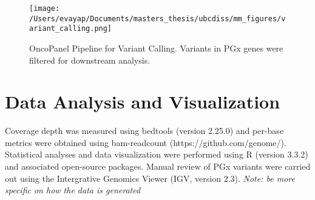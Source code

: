 \begin{figure}
    \centering
    \texttt{[image: /Users/evayap/Documents/masters\_thesis/ubcdiss/mm\_figures/variant\_calling.png]}
    \caption{OncoPanel Pipeline for Variant Calling. Variants in PGx genes were filtered for downstream analysis.}
    \label{fig:ccg-pipeline}   %
\end{figure}

\section{Data Analysis and Visualization}
\label{sec:DataAnalysisandVisualization}

Coverage depth was measured using bedtools (version 2.25.0) and per-base metrics were obtained using bam-readcount (https://github.com/genome/). Statistical analyses and data visualization were performed using R (version 3.3.2) and associated open-source packages. Manual review of PGx variants were carried out using the Intergrative Genomics Viewer (IGV, version 2.3). \textit{Note: be more specific on how the data is generated}

\endinput
\section{Introduction}
\label{sec:Introduction}

Genomics-driven oncology is an emerging approach that aims to use genomic information for patient management and therapeutic intervention in oncologic care. Using MPS technologies, cancer biomarkers with diagnostic, prognostic, predictive, and pharmacogenomic (PGx) significance can be screened at a reduced cost and turn-around time to inform medical decision-making. PGx markers are germline genetic

Application of genome information to guide patient management and therapeutic intervention holds great potential in improving oncology care. One of the driving forces that led to clinical feasibility of genomic sequencing is the advent of massively parallel sequencing (MPS) technologies, which enabled sensitive and accurate sequencing of more target genes with less DNA in a cost-effective and timely manner. At present, various MPS approaches are entering, or have entered the clinic such as targeted sequencing panels, whole exome sequencing, and whole genome sequencing, which create the opportunity to further develop novel clinical biomarkers in addition to screening for biomarkers with established clinical utility.

